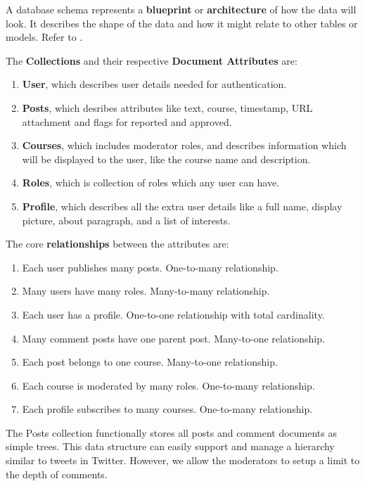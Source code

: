 A database schema represents a \textbf{blueprint} or \textbf{architecture} of how the data will look. 
It describes the shape of the data and how it might relate to other tables or models. Refer to \label{fig:schema}.

The \textbf{Collections} and their respective \textbf{Document Attributes} are:
\begin{enumerate}
    \item \textbf{User}, which describes user details needed for authentication.
    \item \textbf{Posts}, which desribes attributes like text, course, timestamp, URL attachment 
    and flags for reported and approved.
    \item \textbf{Courses}, which includes moderator roles, and describes information which will 
    be displayed to the user, like the course name and description.
    \item \textbf{Roles}, which is collection of roles which any user can have.
    \item \textbf{Profile}, which describes all the extra user details like a full name, display picture, about paragraph, and a list of interests.
\end{enumerate}

The core \textbf{relationships} between the attributes are:
\begin{enumerate}
    \item Each user publishes many posts. One-to-many relationship.
    \item Many users have many roles. Many-to-many relationship.
    \item Each user has a profile. One-to-one relationship with total cardinality.
    \item Many comment posts have one parent post. Many-to-one relationship.
    \item Each post belongs to one course. Many-to-one relationship.
    \item Each course is moderated by many roles. One-to-many relationship.
    \item Each profile subscribes to many courses. One-to-many relationship.
\end{enumerate}

The Posts collection functionally stores all posts and comment documents as simple trees. This data structure can easily support 
and manage a hierarchy similar to tweets in Twitter. However, we allow the moderators to setup a limit to the depth of comments.

